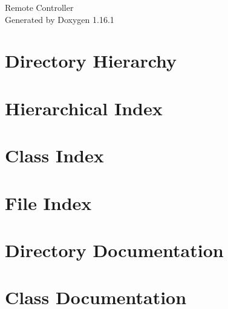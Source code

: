 \documentclass[twoside]{book}
\newcommand{\+}{\discretionary{\mbox{\scriptsize$\hookleftarrow$}}{}{}}
\newcommand{\clearemptydoublepage}{%
    \newpage{\pagestyle{empty}\cleardoublepage}%
  }
\begin{document}
  \raggedbottom
    \hypersetup{pageanchor=false,
                bookmarksnumbered=true,
                pdfencoding=unicode
               }
  \begin{titlepage}
  \vspace*{7cm}
  \begin{center}%
  {\Large Remote Controller}\\
  \vspace*{1cm}
  {\large Generated by Doxygen 1.16.1}\\
  \end{center}
  \end{titlepage}
  \clearemptydoublepage
  \tableofcontents
  \clearemptydoublepage
  \hypersetup{pageanchor=true}
\chapter{Directory Hierarchy}

\chapter{Hierarchical Index}

\chapter{Class Index}

\chapter{File Index}

\chapter{Directory Documentation}


\chapter{Class Documentation}















\end{document}
